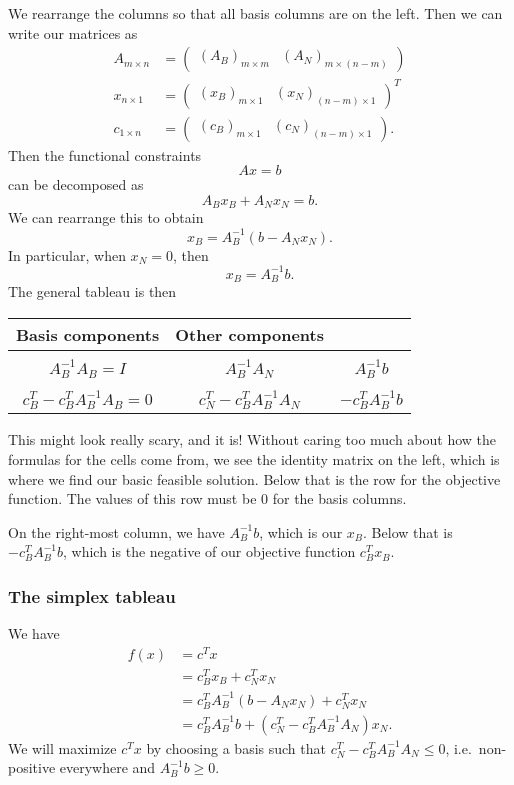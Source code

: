 \documentclass[a4paper]{article}
\begin{document}
We rearrange the columns so that all basis columns are on the left. Then we can write our matrices as
\begin{align*}
  A_{m\times n} &=
  \begin{pmatrix}
    (A_B)_{m\times m} & (A_N)_{m\times (n - m)}
  \end{pmatrix}\\
  x_{n\times 1} &=
  \begin{pmatrix}
    (x_B)_{m\times 1} & (x_N)_{(n - m)\times 1}
  \end{pmatrix}^T\\
  c_{1\times n} &=
  \begin{pmatrix}
    (c_B)_{m\times 1} & (c_N)_{(n - m)\times 1}
  \end{pmatrix}.
\end{align*}
Then the functional constraints
\[
  Ax = b
\]
can be decomposed as
\[
  A_Bx_B + A_Nx_N = b.
\]
We can rearrange this to obtain
\[
  x_B = A_B^{-1}(b - A_N x_N).
\]
In particular, when $x_N = 0$, then
\[
  x_B = A_B^{-1}b.
\]
The general tableau is then
\begin{center}
  \begin{tabular}{ccc}
    \toprule
    Basis components & Other components\\
    \midrule\\
    $A_B^{-1} A_B = I$ & $A_B^{-1}A_N$ & $A_B^{-1}b$\\\\
    \midrule
    \quad$c^T_B - c^T_BA_B^{-1}A_B = 0$\quad & \quad$c_N^T - c_B^TA_B^{-1}A_N$\quad & $-c_B^T A_B^{-1}b$\\
    \bottomrule
  \end{tabular}
\end{center}
This might look really scary, and it is! Without caring too much about how the formulas for the cells come from, we see the identity matrix on the left, which is where we find our basic feasible solution. Below that is the row for the objective function. The values of this row must be $0$ for the basis columns.

On the right-most column, we have $A_B^{-1}b$, which is our $x_B$. Below that is $-c_B^TA_B^{-1}b$, which is the negative of our objective function $c_B^Tx_B$.
\subsubsection{The simplex tableau}
We have
\begin{align*}
  f(x) &= c^T x \\
  &= c_B^T x_B + c_N^T x_N\\
  &= c_B^T A_B^{-1}(b - A_N x_N) + c_N^T x_N\\
  &= c_B^T A_B^{-1}b + (c_N^T - c_B^TA_B^{-1}A_N)x_N.
\end{align*}
We will maximize $c^T x$ by choosing a basis such that $c_N^T - c_B^T A_B^{-1}A_N \leq 0$, i.e.\ non-positive everywhere and $A_B^{-1}b \geq 0$.
\end{document}
